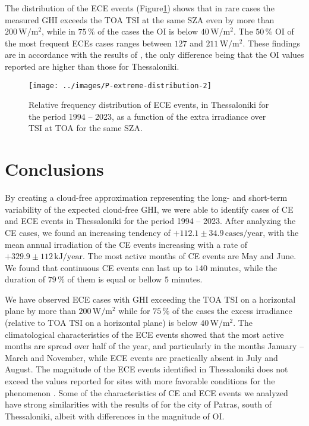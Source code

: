 \documentclass[preprint, 5p,
authoryear]{elsarticle} %
\begin{document}
The distribution of the ECE events
(Figure\nobreakspace{}\ref{fig:P-extreme-distribution}) shows that in
rare cases the measured GHI exceeds the TOA TSI at the same SZA even by
more than \(200\,\text{W}/\text{m}^2\), while in \(75\,\%\) of the cases
the OI is below \(40\,\text{W}/\text{m}^2\). The \(50\,\%\) OI of the
most frequent ECEs cases ranges between \(127\) and
\(211\,\text{W}/\text{m}^2\). These findings are in accordance with the
results of \citet{Vamvakas2020}, the only difference being that the OI
values reported are higher than those for Thessaloniki.

\begin{figure}

{\centering \texttt{[image: ../images/P-extreme-distribution-2]} 

}

\caption{Relative frequency distribution of ECE events, in Thessaloniki for the period 1994 -- 2023, as a function of the extra irradiance over TSI at TOA for the same SZA.}\label{fig:P-extreme-distribution}
\end{figure}

\hypertarget{conclusions}{%
\section{Conclusions}\label{conclusions}}

By creating a cloud-free approximation representing the long- and
short-term variability of the expected cloud-free GHI, we were able to
identify cases of CE and ECE events in Thessaloniki for the period 1994
-- 2023. After analyzing the CE cases, we found an increasing tendency
of \(+112.1\pm 34.9\,\text{cases}/\text{year}\), with the mean annual
irradiation of the CE events increasing with a rate of
\(+329.9\pm 112\,\text{kJ}/\text{year}\). The most active months of CE
events are May and June. We found that continuous CE events can last up
to \(140\) minutes, while the duration of \(79\,\%\) of them is equal or
bellow \(5\) minutes.

We have observed ECE cases with GHI exceeding the TOA TSI on a
horizontal plane by more than \(200\,\text{W}/\text{m}^{2}\) while for
\(75\,\%\) of the cases the excess irradiance (relative to TOA TSI on a
horizontal plane) is below \(40\,\text{W}/\text{m}^{2}\). The
climatological characteristics of the ECE events showed that the most
active months are spread over half of the year, and particularly in the
months January -- March and November, while ECE events are practically
absent in July and August. The magnitude of the ECE events identified in
Thessaloniki does not exceed the values reported for sites with more
favorable conditions for the phenomenon \citep[e.g.,][]{Cordero2023}.
Some of the characteristics of CE and ECE events we analyzed have strong
similarities with the results of \citet{Vamvakas2020} for the city of
Patras, south of Thessaloniki, albeit with differences in the magnitude
of OI.
\end{document}
